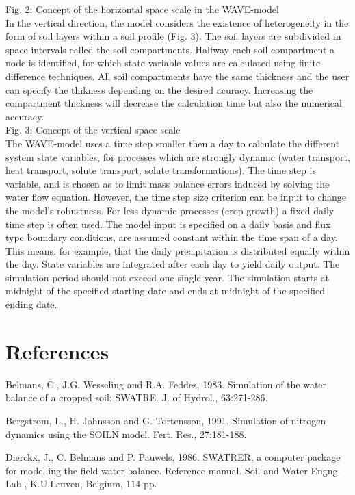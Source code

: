 Fig. 2: Concept of the horizontal space scale in the WAVE-model\\

In the vertical direction, the model considers the existence of heterogeneity in the form of soil layers within a soil profile (Fig. 3). The soil layers are subdivided in space intervals called the soil compartments. Halfway each soil compartment a node is identified, for which state variable values are calculated using finite difference techniques. All soil compartments have the same thickness and the user can specify the thikness depending on the desired acuracy. Increasing the compartment thickness will decrease the calculation time but also the numerical accuracy.\\

Fig. 3: Concept of the vertical space scale\\

The WAVE-model uses a time step smaller then a day to calculate the different system state variables, for processes which are strongly dynamic (water transport, heat transport, solute transport, solute transformations). The time step is variable, and is chosen as to limit mass balance errors induced by solving the water flow equation. However, the time step size criterion can be input to change the model's robustness. For less dynamic processes (crop growth) a fixed daily time step is often used. The model input is specified on a daily basis and flux type boundary conditions, are assumed constant within the time span of a day. This means, for example, that the daily precipitation is distributed equally within the day. State variables are integrated after each day to yield daily output. The simulation period should not exceed one single year. The simulation starts at midnight of the specified starting date and ends at midnight of the specified ending date.\\

\section{References}

Belmans, C., J.G. Wesseling and R.A. Feddes, 1983. Simulation of the water balance of a cropped soil: SWATRE. J. of Hydrol., 63:271-286.

Bergstrom, L., H. Johnsson and G. Tortensson, 1991. Simulation of nitrogen dynamics using the SOILN model. Fert. Res., 27:181-188.

Dierckx, J., C. Belmans and P. Pauwels, 1986. SWATRER, a computer package for modelling the field water balance. Reference manual. Soil and Water Engng. Lab., K.U.Leuven, Belgium, 114 pp.


